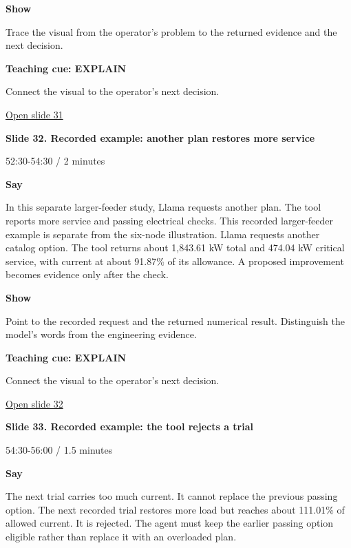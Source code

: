 \documentclass[12pt,letterpaper]{article}
\begin{document}
\textbf{Show}\par Trace the visual from the operator's problem to the returned evidence and the next decision.\par\medskip
\textbf{Teaching cue: EXPLAIN}\par Connect the visual to the operator's next decision.\par\medskip
\vfill\href{https://alaaselim-sudo.github.io/GridGuard-Agentic-AI-Tutorials/operator-cases/#/31}{Open slide 31}\par
\clearpage{}
{\Large\bfseries\color{IEEEBlue} Slide 32. Recorded example: another plan restores more service\par}\medskip
{\small\color{Slate} 52:30-54:30 /\allowbreak{} 2 minutes\par}\medskip
\textbf{Say}\par In this separate larger-feeder study, Llama requests another plan. The tool reports more service and passing electrical checks. This recorded larger-feeder example is separate from the six-node illustration. Llama requests another catalog option. The tool returns about 1,843.61 kW total and 474.04 kW critical service, with current at about 91.87\% of its allowance. A proposed improvement becomes evidence only after the check.\par\medskip
\textbf{Show}\par Point to the recorded request and the returned numerical result. Distinguish the model's words from the engineering evidence.\par\medskip
\textbf{Teaching cue: EXPLAIN}\par Connect the visual to the operator's next decision.\par\medskip
\vfill\href{https://alaaselim-sudo.github.io/GridGuard-Agentic-AI-Tutorials/operator-cases/#/32}{Open slide 32}\par
\clearpage{}
{\Large\bfseries\color{IEEEBlue} Slide 33. Recorded example: the tool rejects a trial\par}\medskip
{\small\color{Slate} 54:30-56:00 /\allowbreak{} 1.5 minutes\par}\medskip
\textbf{Say}\par The next trial carries too much current. It cannot replace the previous passing option. The next recorded trial restores more load but reaches about 111.01\% of allowed current. It is rejected. The agent must keep the earlier passing option eligible rather than replace it with an overloaded plan.\par\medskip
\end{document}
